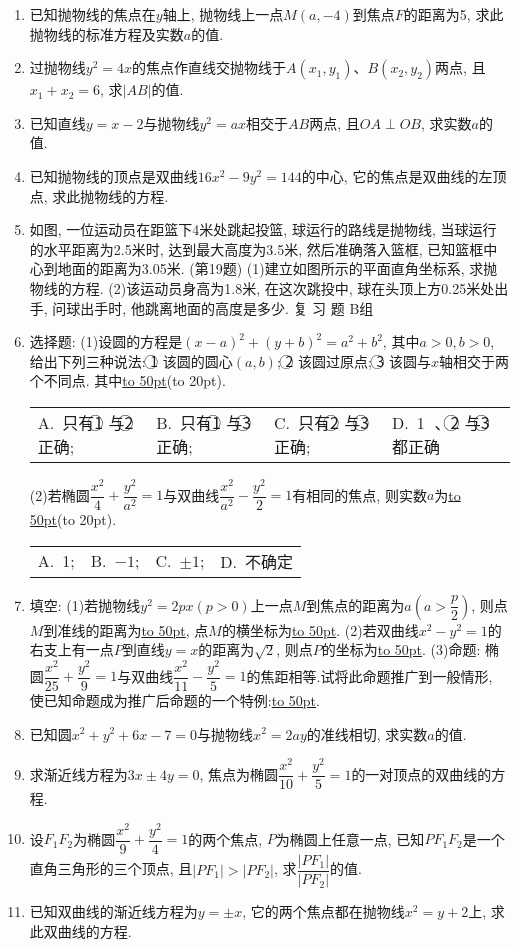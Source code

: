 \documentclass[10pt,a4paper]{article}
\newcommand{\blank}[1]{\underline{\hbox to #1pt{}}}
\newcommand{\bracket}[1]{(\hbox to #1pt{})}
\newcommand{\fourch}[4]{\par\begin{tabular}{p{.23\textwidth}p{.23\textwidth}p{.23\textwidth}p{.23\textwidth}}
A.~#1 &B.~#2& C.~#3& D.~#4
\end{tabular}}
\begin{document}
\begin{enumerate}[1.]
\item 已知抛物线的焦点在$y$轴上, 抛物线上一点$M(a,-4)$到焦点$F$的距离为5, 求此抛物线的标准方程及实数$a$的值.
\item 过抛物线$y^2=4x$的焦点作直线交抛物线于$A(x_1,y_1)$、$B(x_2,y_2)$两点, 且$x_1+x_2=6$, 求$|AB|$的值.
\item 已知直线$y=x-2$与抛物线$y^2=ax$相交于$AB$两点, 且$OA\perp OB$, 求实数$a$的值.
\item 已知抛物线的顶点是双曲线$16x^2-9y^2=144$的中心, 它的焦点是双曲线的左顶点, 求此抛物线的方程.
\item 如图, 一位运动员在距篮下4米处跳起投篮, 球运行的路线是抛物线, 当球运行的水平距离为2.5米时, 达到最大高度为3.5米, 然后准确落入篮框, 已知篮框中心到地面的距离为3.05米.
(第19题)
(1)建立如图所示的平面直角坐标系, 求抛物线的方程.
(2)该运动员身高为1.8米, 在这次跳投中, 球在头顶上方0.25米处出手, 问球出手时, 他跳离地面的高度是多少.
复 习 题
B组
\item 选择题:
(1)设圆的方程是$(x-a)^2+(y+b)^2=a^2+b^2$, 其中$a>0,b>0$, 给出下列三种说法:
\textcircled{1} 该圆的圆心$(a,b)$;
\textcircled{2} 该圆过原点;
\textcircled{3} 该圆与$x$轴相交于两个不同点.
其中\blank{50}\bracket{20}.
\fourch{只有\textcircled{1} 与\textcircled{2} 正确;}{只有\textcircled{1} 与\textcircled{3} 正确;}{只有\textcircled{2} 与\textcircled{3} 正确;}{\textcircled{1} 、\textcircled{2} 与\textcircled{3} 都正确}
(2)若椭圆$\dfrac{x^2}4+\dfrac{y^2}{a^2}=1$与双曲线$\dfrac{x^2}{a^2}-\dfrac{y^2}2=1$有相同的焦点, 则实数$a$为\blank{50}\bracket{20}.
\fourch{1;}{$-1$;}{$\pm 1$;}{不确定}
\item 填空:
(1)若抛物线$y^2=2px(p>0)$上一点$M$到焦点的距离为$a(a>\dfrac p2)$, 则点$M$到准线的距离为\blank{50}, 点$M$的横坐标为\blank{50}.
(2)若双曲线$x^2-y^2=1$的右支上有一点$P$到直线$y=x$的距离为$\sqrt 2$, 则点$P$的坐标为\blank{50}.
(3)命题: 椭圆$\dfrac{x^2}{25}+\dfrac{y^2}9=1$与双曲线$\dfrac{x^2}{11}-\dfrac{y^2}5=1$的焦距相等.试将此命题推广到一般情形, 使已知命题成为推广后命题的一个特例:\blank{50}.
\item 已知圆$x^2+y^2+6x-7=0$与抛物线$x^2=2ay$的准线相切, 求实数$a$的值.
\item 求渐近线方程为$3x\pm 4y=0$, 焦点为椭圆$\dfrac{x^2}{10}+\dfrac{y^2}5=1$的一对顶点的双曲线的方程.
\item 设$F_1F_2$为椭圆$\dfrac{x^2}9+\dfrac{y^2}4=1$的两个焦点, $P$为椭圆上任意一点, 已知$PF_1F_2$是一个直角三角形的三个顶点, 且$|PF_1|>|PF_2|$, 求$\dfrac{|P{F_1}|}{|P{F_2}|}$的值.
\item 已知双曲线的渐近线方程为$y=\pm x$, 它的两个焦点都在抛物线$x^2=y+2$上, 求此双曲线的方程.

\end{enumerate}
\end{document}
